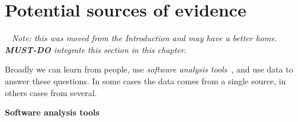 \section{Potential sources of evidence}~\label{sec:potential-sources-of-evidence}
\emph{Note: this was moved from the Introduction and may have a better home. \textbf{MUST-DO} integrate this section in this chapter.}




Broadly we can learn from people, use \textit{software analysis tools}~, and use data to answer these questions. In some cases the data comes from a single source, in others cases from several.

\textbf{Software analysis tools} 

